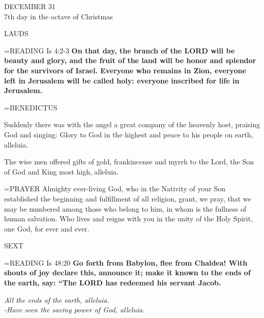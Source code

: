 \begin{center}\normalsize DECEMBER 31\\
\footnotesize 7th day in the octave of Christmas\\
\end{center}

\begin{flushleft}\normalsize LAUDS\\\end{flushleft}

\hangindent=\parindent \small{READING}    Is 4:2-3 \textbf{   On that day, the branch of the LORD will be beauty and glory, and the fruit of the land will be honor and splendor for the survivors of Israel. Everyone who remains in Zion, everyone left in Jerusalem will be called holy: everyone inscribed for life in Jerusalem.\\}

\hangindent=\parindent \small BENEDICTUS
\begin{description}[labelindent=\parindent, noitemsep, leftmargin=*]
\item [(before the Epiphany):]   Suddenly there was with the angel a great company of the heavenly host, praising God and singing: Glory to God in the highest and peace to his people on earth, alleluia.
\item [(Tuesday after the Epiphany):]  The wise men offered gifts of gold, frankincense and myrrh to the Lord, the Son of God and King most high, alleluia.
\end{description}

\hangindent=\parindent \small{PRAYER  Almighty ever-living God, who in the Nativity of your Son established the beginning and fulfillment of all religion, grant, we pray, that we may be numbered among those who belong to him, in whom is the fullness of human salvation. Who lives and reigns with you in the unity of the Holy Spirit, one God, for ever and ever.}

\begin{flushleft}\normalsize SEXT\\\end{flushleft}

\hangindent=\parindent \small{READING}    Is 48:20 \textbf{   Go forth from Babylon, flee from Chaldea! With shouts of joy declare this, announce it; make it known to the ends of the earth, say: “The LORD has redeemed his servant Jacob.}

\begin{center}
\textit{All the ends of the earth, alleluia.\\
-Have seen the saving power of God, alleluia.}
\end{center}

